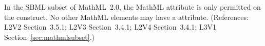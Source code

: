 In the SBML subset of MathML~2.0, the MathML attribute
 is only permitted on the  construct.
No other MathML elements may have a  attribute.
(References: L2V2 Section~3.5.1; L2V3 Section~3.4.1; 
L2V4 Section~3.4.1; L3V1 Section~\ref{sec:mathmlsubset}.)
